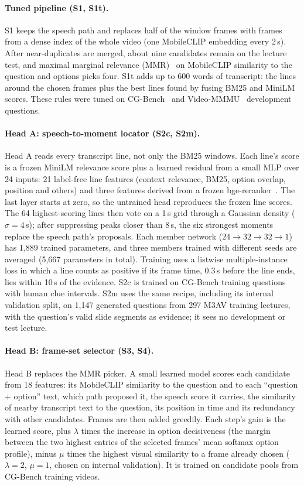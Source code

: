 \paragraph{Tuned pipeline (S1, S1t).}
S1 keeps the speech path and replaces half of the window frames with frames from a dense index of the whole video (one MobileCLIP embedding every 2\,s).
After near-duplicates are merged, about nine candidates remain on the lecture test, and maximal marginal relevance (MMR)~\cite{carbonell1998mmr} on MobileCLIP similarity to the question and options picks four.
S1t adds up to 600 words of transcript: the lines around the chosen frames plus the best lines found by fusing BM25 and MiniLM scores.
These rules were tuned on CG-Bench~\cite{chen2024cgbench} and Video-MMMU~\cite{hu2025videommmu} development questions.

\paragraph{Head A: speech-to-moment locator (S2c, S2m).}
Head A reads every transcript line, not only the BM25 windows.
Each line's score is a frozen MiniLM relevance score plus a learned residual from a small MLP over 24 inputs: 21 label-free line features (context relevance, BM25, option overlap, position and others) and three features derived from a frozen bge-reranker~\cite{xiao2023cpack}.
The last layer starts at zero, so the untrained head reproduces the frozen line scores.
The 64 highest-scoring lines then vote on a 1\,s grid through a Gaussian density ($\sigma{=}4$\,s); after suppressing peaks closer than 8\,s, the six strongest moments replace the speech path's proposals.
Each member network ($24{\to}32{\to}32{\to}1$) has 1,889 trained parameters, and three members trained with different seeds are averaged (5,667 parameters in total).
Training uses a listwise multiple-instance loss in which a line counts as positive if its frame time, 0.3\,s before the line ends, lies within 10\,s of the evidence.
S2c is trained on CG-Bench training questions with human clue intervals.
S2m uses the same recipe, including its internal validation split, on 1,147 generated questions from 297 M3AV training lectures, with the question's valid slide segments as evidence; it sees no development or test lecture.

\paragraph{Head B: frame-set selector (S3, S4).}
Head B replaces the MMR picker.
A small learned model scores each candidate from 18 features: its MobileCLIP similarity to the question and to each ``question + option'' text, which path proposed it, the speech score it carries, the similarity of nearby transcript text to the question, its position in time and its redundancy with other candidates.
Frames are then added greedily.
Each step's gain is the learned score, plus $\lambda$ times the increase in option decisiveness (the margin between the two highest entries of the selected frames' mean softmax option profile), minus $\mu$ times the highest visual similarity to a frame already chosen ($\lambda{=}2$, $\mu{=}1$, chosen on internal validation).
It is trained on candidate pools from CG-Bench training videos.

